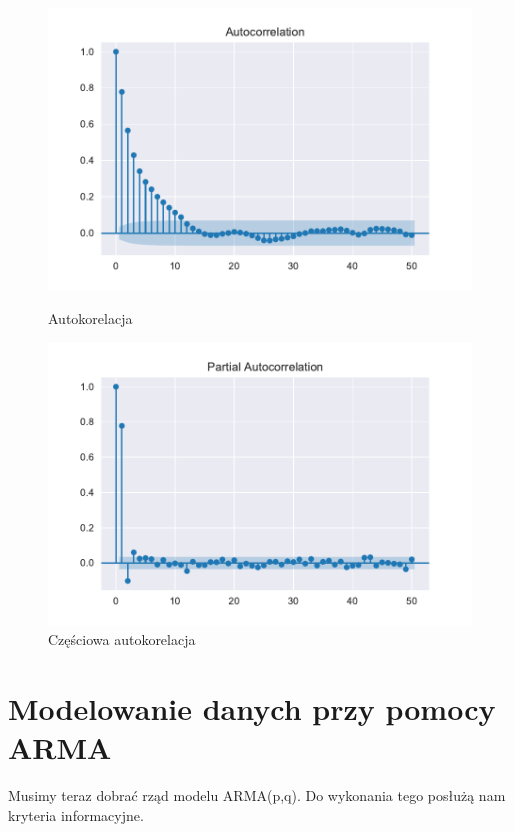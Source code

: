 \documentclass{article}
\theoremstyle{break}
\begin{document}
\begin{figure}[H]
	\begin{center}
		\begin{minipage}{0.49\linewidth}
			\centering
			\includegraphics[scale=0.49]{acf2.pdf}
			\caption{Autokorelacja}
			\label{fig:acf2}
		\end{minipage}
		\begin{minipage}{0.49\linewidth}
			\centering
			\includegraphics[scale=0.49]{pacf2.pdf}
			\caption{Częściowa autokorelacja}
			\label{fig:pacf2}
		\end{minipage}
	\end{center}
\end{figure}

\section{Modelowanie danych przy pomocy ARMA}
Musimy teraz dobrać rząd modelu ARMA(p,q). Do wykonania tego posłużą nam kryteria informacyjne.
\end{document}
